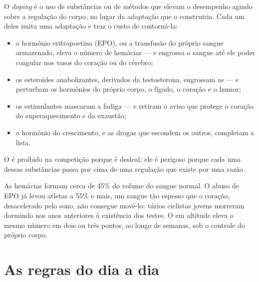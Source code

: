 \begin{proposition}[Doping]\label{prop:g10:sport-and-health:doping}
O \emph{doping} é o uso de substâncias ou de métodos que
elevam o desempenho agindo sobre a regulação do corpo, no lugar da
adaptação que o  construiria. Cada um deles imita uma
adaptação e traz o custo de contorná-la:
\begin{itemize}
  \item o hormônio eritropoetina (EPO), ou a transfusão do próprio
        sangue armazenado, eleva o número de hemácias --- e engrossa o
        sangue até ele poder coagular nos vasos do coração ou do
        cérebro;
  \item os esteroides anabolizantes, derivados da testosterona,
        engrossam as  --- e perturbam os hormônios do
        próprio corpo, o fígado, o coração e o humor;
  \item os estimulantes mascaram a fadiga --- e retiram o aviso que
        protege o coração do superaquecimento e da exaustão;
  \item o hormônio do crescimento, e as drogas que escondem os outros,
        completam a lista.
\end{itemize}
O  é proibido na competição porque é desleal; ele é perigoso
porque cada uma dessas substâncias passa por cima de uma regulação que
existe por uma razão.
\end{proposition}
\admitted

\begin{example}\label{ex:g10:sport-and-health:epo}
As hemácias formam cerca de 45\% do volume do sangue normal. O abuso de
EPO já levou atletas a 55\% e mais, um sangue tão espesso que o
coração, desacelerado pelo sono, não consegue movê-lo: vários ciclistas
jovens morreram dormindo nos anos anteriores à existência dos testes. O
 em altitude eleva o mesmo número em dois ou três pontos, ao
longo de semanas, sob o controle do próprio corpo.
\end{example}

\section{As regras do dia a dia}

